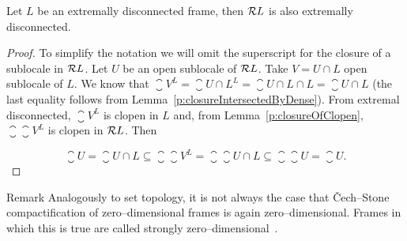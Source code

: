 \begin{proposition}\label{p:extrDiscPreserv}
    Let $L$ be an extremally disconnected frame, then $\mathcal{R} L$ is also extremally disconnected.
\end{proposition}
\begin{proof}
    To simplify the notation we will omit the superscript for the closure of a sublocale in $\mathcal{R} L$. Let $U$ be an open sublocale of $\mathcal{R} L$. Take $V = U\cap L$ open sublocale of $L$. We know that $\closure V^L = \closure{U\cap L}^L = \closure{U\cap L}\cap L = \closure U\cap L$ (the last equality follows from Lemma~\ref{p:closureIntersectedByDense}). From extremal disconnected, $\closure V^L$ is clopen in $L$ and, from Lemma~\ref{p:closureOfClopen}, $\closure{\closure V^L}$ is clopen in $\mathcal{R} L$. Then

    $$ \closure U = \closure{U\cap L} \subseteq \closure{\closure{V}^L} = \closure{\closure U\cap L} \subseteq \closure{\closure U} = \closure U.$$
\end{proof}

\begin{block}{Remark}
    Analogously to set topology, it is not always the case that Čech--Stone compactification of zero--dimensional frames is again zero--dimensional. Frames in which this is true are called strongly zero--dimensional~\cite{kou2002strongly}.
\end{block}



